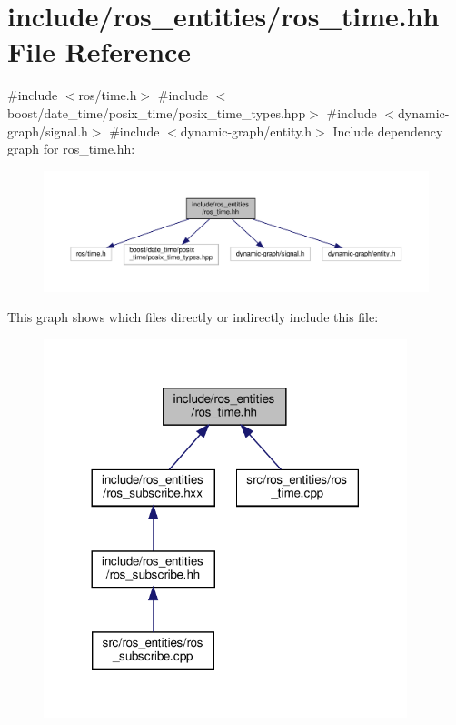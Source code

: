 \hypertarget{ros__time_8hh}{}\section{include/ros\+\_\+entities/ros\+\_\+time.hh File Reference}
\label{ros__time_8hh}
{\ttfamily \#include $<$ros/time.\+h$>$}\newline
{\ttfamily \#include $<$boost/date\+\_\+time/posix\+\_\+time/posix\+\_\+time\+\_\+types.\+hpp$>$}\newline
{\ttfamily \#include $<$dynamic-\/graph/signal.\+h$>$}\newline
{\ttfamily \#include $<$dynamic-\/graph/entity.\+h$>$}\newline
Include dependency graph for ros\+\_\+time.\+hh\+:
\nopagebreak
\begin{figure}[H]
\begin{center}
\leavevmode
\includegraphics[width=350pt]{ros__time_8hh__incl}
\end{center}
\end{figure}
This graph shows which files directly or indirectly include this file\+:
\nopagebreak
\begin{figure}[H]
\begin{center}
\leavevmode
\includegraphics[width=300pt]{ros__time_8hh__dep__incl}
\end{center}
\end{figure}
